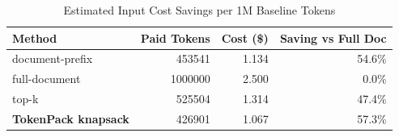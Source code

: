 \begin{table}[!t]
\caption{Estimated Input Cost Savings per 1M Baseline Tokens}
\label{tab:cost-savings}
\centering
\scriptsize
\begin{tabular}{lrrr}
\hline
Method & Paid Tokens & Cost (\$) & Saving vs Full Doc \\
\hline
document-prefix & 453541 & 1.134 & 54.6\% \\
full-document & 1000000 & 2.500 & 0.0\% \\
top-k & 525504 & 1.314 & 47.4\% \\
\rowcolor{tokenpackhighlight}\textbf{TokenPack knapsack} & 426901 & 1.067 & 57.3\% \\
\hline
\end{tabular}
\end{table}
